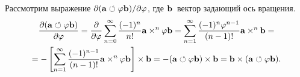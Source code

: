 Рассмотрим выражение $\partial({\bf a}\circlearrowleft\varphi{\bf b})/\partial\varphi$, где $\b$~вектор задающий ось вращения.
\begin{multline}
\dfdx{(\a\rotop\varphi\b)} \varphi = \dfdx{}{\varphi}
\sum\limits_{n=0}^\infty \frac{(-1)^n}{n!} \a \times^n \varphi\b = 
\sum\limits_{n=1}^\infty \frac{(-1)^n\varphi^{n-1}}{(n-1)!} \a \times^n \b = \\ =
-\left[\sum\limits_{n=1}^\infty \frac{(-1)^{n-1}}{(n-1)!} \a \times^n\varphi\b\right]\times\b = 
-(\a\rotop\varphi\b)\times\b = \b \times(\a\rotop\varphi\b).
\notag%
\end{multline}

\endinput
Рассмотрим выражение $\partial(\a(t)\rotop\varphi(t)\b)/\partial t$, где $\b$~вектор задающий ось вращения:
\begin{multline}
\dfdx{(\a(t)\rotop\varphi(t)\b)} t = \dfdx{}{t}
\sum\limits_{n=0}^\infty \frac{(-1)^n}{n!} \a(t) \times^n \varphi(t)\b = \\
= \sum\limits_{n=0}^\infty \frac{(-1)^n}{n!}\left[ \dfdx\a t \times^n \varphi \b +
 n \varphi^{n-1} \dfdx\varphi t \a \times^n \b \right] = \\ =
\dfdx\a t \rotop \varphi \b -\dfdx\varphi t \left[\sum\limits_{n=1}^\infty \frac{(-1)^{n-1}}{(n-1)!} \a \times^{n-1}\varphi\b\right]\times\b = \\
 = \dfdx\a t \rotop \varphi \b + \dfdx\varphi t \b \times(\a\rotop\varphi\b).
\label{rotop:da:dt:eq}
\end{multline}

На основе (\ref{rotop:3v:rotop}) получаем
$$
\beta_1'(b) = \frac{b\cos b-\sin b}{b^2}, \qquad \beta_2'(b) = \frac{b^2 \sin b - 2b(1-\cos b)}{b^4},
$$
откуда
\begin{multline}
\dfdx{(\a(t)\rotop\b(t))} t = 
\dot\a\big(1-b^2\beta_2(b)\big) - \a\big(2b\beta_2(b)\dot b + b^2\beta'_2(b)\dot b\big) 
-\\- [\dot\a\times\b]\,\beta_1(b) - [\a\times\dot\b]\,\beta_1(b) - [\a\times\b]\,\beta'_1(b) \dot b
+\\+ \dot\b\,(\a\cdot\b)\,\beta_2(b) + \b\,(\dot\a\cdot\b)\,\beta_2(b) + \b\,(\a\cdot\dot\b)\,\beta_2(b) +
\b\,(\a\cdot\b)\,\beta_2'(b) \dot b
=\\=
\dot\a \cos b + \a \dot b \sin b
- [\dot\a\times\b]\,\beta_1(b) - [\a\times\dot\b]\,\beta_1(b) - [\a\times\b]\,\frac{b\cos b-\sin b}{b^2} \dot b
+\\+ \dot\b\,(\a\cdot\b)\,\beta_2(b) + \b\,(\dot\a\cdot\b)\,\beta_2(b) + \b\,(\a\cdot\dot\b)\,\beta_2(b) +
\b\,(\a\cdot\b)\,\frac{b^2 \sin b - 2b(1-\cos b)}{b^4} \dot b
.
\label{rotop:da:dt:33v:eq}
\end{multline}

